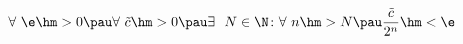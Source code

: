 \label{perednosom}
        $\forall\ \e\hm>0\pau \forall\  \tilde c\hm>0\pau \exists\ \ N\in\N\colon \forall\  n\hm>N\pau \dfrac{\tilde c}{2^n}\hm<\e$
    